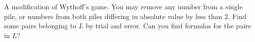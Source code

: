A modification of Wythoff's game. You may remove any number from a single pile, or numbers from both piles differing in absolute value by less than $2$. Find some pairs belonging to $L$ by trial and error. Can you find formulas for the pairs in $L$?
